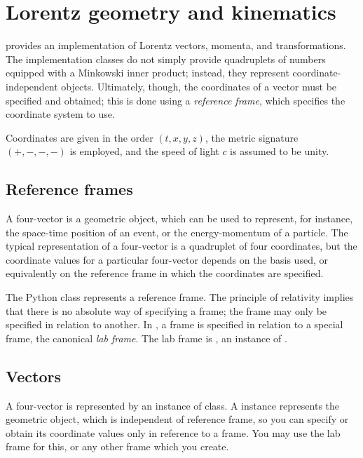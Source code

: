 \chapter{Lorentz geometry and kinematics}

\pyhep provides an implementation of Lorentz vectors, momenta, and
transformations.  The implementation classes do not simply provide
quadruplets of numbers equipped with a Minkowski inner product; instead,
they represent coordinate-independent objects.  Ultimately, though, the
coordinates of a vector must be specified and obtained; this is done
using a \emph{reference frame}, which specifies the coordinate system to
use. 

Coordinates are given in the order $(t, x, y, z)$, the metric signature
$(+,-,-,-)$ is employed, and the speed of light $c$ is assumed to be
unity.

\section{Reference frames}

A four-vector is a geometric object, which can be used to represent, for
instance, the space-time position of an event, or the energy-momentum of
a particle.  The typical representation of a four-vector is a quadruplet
of four coordinates, but the coordinate values for a particular
four-vector depends on the basis used, or equivalently on the reference
frame in which the coordinates are specified.

The Python class  represents a reference
frame.  The principle of relativity implies that there is no absolute
way of specifying a frame; the frame may only be specified in relation
to another.  In \pyhep, a frame is specified in relation to a special
frame, the canonical \emph{lab frame}.  The lab frame is
, an instance of .  

\section{Vectors}

A four-vector is represented by an instance of
 class.  A  instance represents
the geometric object, which is independent of reference frame, so you
can specify or obtain its coordinate values only in reference to a
frame.  You may use the lab frame for this, or any other frame which you
create.

